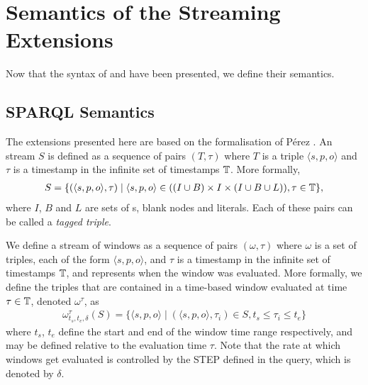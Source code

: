 \section{Semantics of the Streaming Extensions}
\label{semanticsstreaming}

Now that the syntax of \sparqlstr and \stwoo have been presented, we define their semantics.

\subsection{SPARQL Semantics}
\label{sparqlstrsemantics}

The \sparql extensions presented here are based on the formalisation of %
P\'erez \etal \cite{Perez_09}.
An \rdf stream $S$ is defined as a sequence of pairs $(T,\tau)$ where $T$ is a triple  $\langle s,p,o \rangle$ and $\tau$ is a timestamp in the infinite set of timestamps $\mathbb{T}$.
More formally, 
\begin{align*}
  S = \{( \langle s,p,o \rangle, \tau) \mid \langle s,p,o \rangle \in ((I \cup B) \times I \times (I \cup B \cup L)  ), \tau \in \mathbb{T}\},
\end{align*}
where $I$, $B$ and $L$ are sets of \iri \!\!s, blank nodes and literals. 
Each of these pairs can be called a \emph{tagged triple}.

We define a stream of windows as a sequence of pairs $(\omega, \tau)$ where $\omega$ is a set of triples, each of the form $\langle s, p, o \rangle$, and $\tau$ is a timestamp in the infinite set of timestamps $\mathbb{T}$, and represents when the window was evaluated.
More formally, we define the triples that are contained in a time-based window evaluated at time $\tau \in \mathbb{T}$, denoted $\omega^{\tau}$, as
\begin{align*}
  \omega^{\tau}_{t_{s},t_{e},\delta}(S)=\{ \langle s,p,o \rangle \mid (\langle s,p,o \rangle, \tau_i) \in S, t_{s} \leq \tau_i \leq t_{e}\}
\end{align*}
where $t_s$, $t_e$ define the start and end of the window time range respectively, and may be defined relative to the evaluation time $\tau$. 
Note that the rate at which windows get evaluated is controlled by the \textsf{STEP} defined in the query, which is denoted by $\delta$.%

